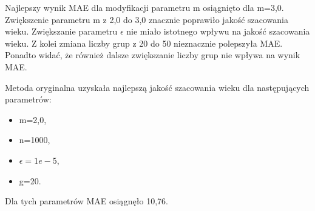 \documentclass[a4paper,twoside,12pt]{book}
\begin{document}
    Najlepszy wynik MAE dla modyfikacji parametru m osiągnięto dla m=3,0. Zwiększenie parametru m z 2,0 do 3,0
    znacznie poprawiło jakość szacowania wieku.
    Zwiększanie parametru $\epsilon$ nie miało istotnego wpływu na jakość szacowania wieku.
    Z kolei zmiana liczby grup z 20 do 50 nieznacznie polepszyła MAE. Ponadto widać, że również dalsze zwiększanie
    liczby grup
    nie
    wpływa na wynik MAE.

    Metoda oryginalna uzyskała najlepszą jakość szacowania wieku dla następujących parametrów:
    \begin{itemize}
        \item m=2,0,
        \item n=1000,
        \item $\epsilon=1e-5$,
        \item g=20.
    \end{itemize}
    Dla tych parametrów MAE osiągnęło 10,76.
\end{document}
